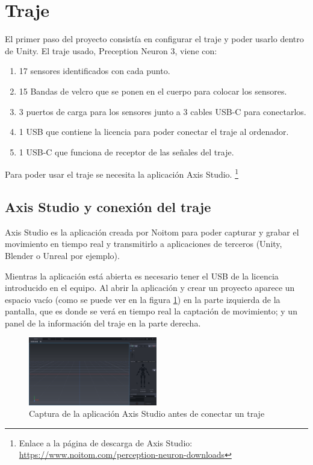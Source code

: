 \section{Traje}
\label{sec:traje}

El primer paso del proyecto consistía en configurar el traje y poder usarlo dentro de Unity.
El traje usado, Preception Neuron 3, viene con:

\begin{enumerate}
	\renewcommand{\theenumi}{\alph{enumi}}
	\item 17 sensores identificados con cada punto.
	\item 15 Bandas de velcro que se ponen en el cuerpo para colocar los sensores.
	\item 3 puertos de carga para los sensores junto a 3 cables USB-C para conectarlos.
	\item 1 USB que contiene la licencia para poder conectar el traje al ordenador.
	\item 1 USB-C que funciona de receptor de las señales del traje.
\end{enumerate}

Para poder usar el traje se necesita la aplicación Axis Studio. \footnote{Enlace a la página de descarga de Axis Studio: \url{https://www.noitom.com/perception-neuron-downloads}}
\subsection{Axis Studio y conexión del traje}
Axis Studio es la aplicación creada por Noitom para poder capturar y grabar el movimiento en tiempo real y transmitirlo a aplicaciones de terceros (Unity, Blender o Unreal por ejemplo).

Mientras la aplicación está abierta es necesario tener el USB de la licencia introducido en el equipo.
Al abrir la aplicación y crear un proyecto aparece un espacio vacío (como se puede ver en la figura \ref{fig:AxisSinTraje}) en la parte izquierda de la pantalla, que es donde se verá en tiempo real la captación de movimiento; y un panel de la información del traje en la parte derecha.

\begin{figure}[H]
	\centering
	\includegraphics[width=0.5\textwidth]{Imagenes/Bitmap/AxisSinTraje.PNG}
	\caption{Captura de la aplicación Axis Studio antes de conectar un traje}
	\label{fig:AxisSinTraje}
\end{figure}

